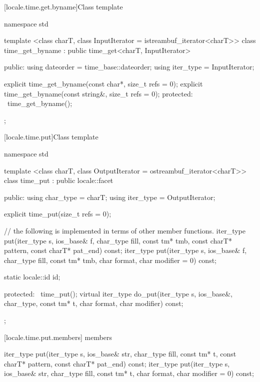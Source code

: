 [locale.time.get.byname]{Class template }

%
\begin{codeblock}
namespace std {
  template <class charT, class InputIterator = istreambuf_iterator<charT>>
  class time_get_byname : public time_get<charT, InputIterator> {
  public:
    using dateorder = time_base::dateorder;
    using iter_type = InputIterator;

    explicit time_get_byname(const char*, size_t refs = 0);
    explicit time_get_byname(const string&, size_t refs = 0);
  protected:
    ~time_get_byname();
  };
}
\end{codeblock}

[locale.time.put]{Class template }

%
\begin{codeblock}
namespace std {
  template <class charT, class OutputIterator = ostreambuf_iterator<charT>>
  class time_put : public locale::facet {
  public:
    using char_type = charT;
    using iter_type = OutputIterator;

    explicit time_put(size_t refs = 0);

    // the following is implemented in terms of other member functions.
    iter_type put(iter_type s, ios_base& f, char_type fill, const tm* tmb,
                  const charT* pattern, const charT* pat_end) const;
    iter_type put(iter_type s, ios_base& f, char_type fill,
                  const tm* tmb, char format, char modifier = 0) const;

    static locale::id id;

  protected:
    ~time_put();
    virtual iter_type do_put(iter_type s, ios_base&, char_type, const tm* t,
                             char format, char modifier) const;
  };
}
\end{codeblock}

[locale.time.put.members]{ members}

%
\begin{itemdecl}
iter_type put(iter_type s, ios_base& str, char_type fill, const tm* t,
              const charT* pattern, const charT* pat_end) const;
iter_type put(iter_type s, ios_base& str, char_type fill, const tm* t,
              char format, char modifier = 0) const;
\end{itemdecl}

